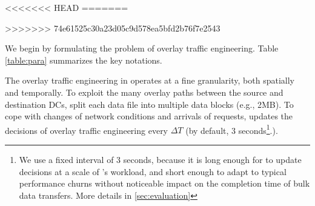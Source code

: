 \begin{table}[t]
\begin{center}
\end{center}
<<<<<<< HEAD
\vspace{-0.4cm}
=======
\caption{Notations used in \name's decision-making logic.}
\vspace{-0.8cm}
>>>>>>> 74e61525c30a23d05c9d578ea5bfd2b76f7e2543
\label{table:para}
\end{table}

We begin by formulating the problem of overlay traffic engineering.
Table \ref{table:para} summarizes the key notations.

The overlay traffic engineering in \name operates at a
fine granularity, both spatially and temporally. To exploit the many
overlay paths between the source and destination DCs, \name split
each data file into multiple data blocks (e.g., 2MB).
To cope with changes of network conditions and arrivals of requests,
\name updates the decisions of overlay traffic engineering every
$\Delta T$ (by default, 3 seconds\footnote{We use a fixed interval of
3 seconds, because it is long enough for \name to update decisions at
a scale of \company's workload, and short enough to adapt to typical
performance churns without noticeable impact on the completion time
of bulk data transfers.
More details in \Section\ref{sec:evaluation}}.).


